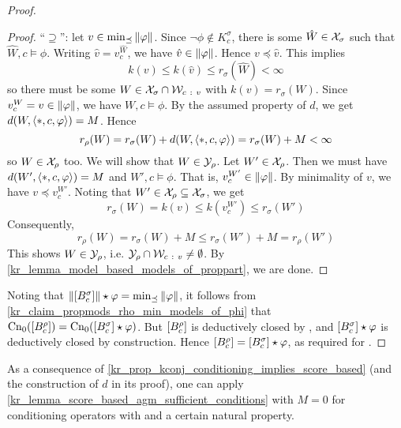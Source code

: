 \begin{proof}
\begin{proof}
            ``$\supseteq$'': let $v \in \min_{\preceq}{\|{\varphi}\|}$. Since
            $\neg\phi \notin K^\sigma_c$, there is some $\hat{W} \in \mathcal{X}_\sigma$
            such that $\hat{W}, c \models \phi$. Writing $\hat{v} =
            v^{\hat{W}}_c$, we have $\hat{v} \in \|{\varphi}\|$. Hence $v
            \preceq \hat{v}$. This implies
            \[
                k(v) \le k(\hat{v}) \le r_\sigma(\hat{W}) < \infty
            \]
            so there must be some $W \in \mathcal{X}_\sigma \cap \mathcal{W}_{c\ :\  v}$ with
            $k(v) = r_\sigma(W)$. Since $v^W_c = v \in \|{\varphi}\|$, we
            have $W, c \models \phi$. By the assumed property of $d$, we get
            $d(W, \langle {\ast, c, \varphi} \rangle) = M$. Hence
            \[
                r_\rho(W)
                = r_\sigma(W) + d(W, \langle {\ast, c, \varphi} \rangle)
                = r_\sigma(W) + M
                < \infty
            \]
            so $W \in \mathcal{X}_\rho$ too. We will show that $W \in \mathcal{Y}_\rho$. Let $W'
            \in \mathcal{X}_\rho$. Then we must have $d(W', \langle {\ast, c, \varphi} \rangle) = M$
            and $W', c \models \phi$. That is, $v^{W'}_c \in \|{\varphi}\|$.
            By minimality of $v$, we have $v \preceq v^{W'}_c$. Noting that $W'
            \in \mathcal{X}_\rho \subseteq \mathcal{X}_\sigma$, we get
            \[
                r_\sigma(W)
                = k(v)
                \le k(v^{W'}_c)
                \le r_\sigma(W')
            \]
            Consequently,
            \[
                r_\rho(W)
                = r_\sigma(W) + M
                \le r_\sigma(W') + M
                = r_\rho(W')
            \]
            This shows $W \in \mathcal{Y}_\rho$, i.e. $\mathcal{Y}_\rho \cap \mathcal{W}_{c\ :\  v} \ne
            \emptyset$. By \cref{kr_lemma_model_based_models_of_proppart}, we are
            done.
        \end{proof}

    Noting that $\|{\left[{B^\sigma_c}\right]}\| \star \varphi =
    \min_{\preceq}{\|{\varphi}\|}$, it follows from
    \cref{kr_claim_propmods_rho_min_models_of_phi} that
    $\operatorname{Cn}_0(\left[{B^\rho_c}\right]) = \operatorname{Cn}_0(\left[{B^\sigma_c}\right] \star \varphi)$.
    But $\left[{B^\rho_c}\right]$ is deductively closed by \closure{}, and
    $\left[{B^\sigma_c}\right]
    \star \varphi$ is deductively closed by construction. Hence
    $\left[{B^\rho_c}\right] = \left[{B^\sigma_c}\right] \star \varphi$, as required for
    \agm{}.
\end{proof}

As a consequence of \cref{kr_prop_kconj_conditioning_implies_score_based} (and the
construction of $d$ in its proof), one can apply
\cref{kr_lemma_score_based_agm_sufficient_conditions} with $M = 0$ for
conditioning operators with \kconj{} and a certain natural property.

